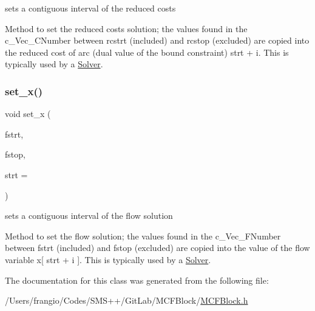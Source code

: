 sets a contiguous interval of the reduced costs 

Method to set the reduced costs solution; the values found in the c\+\_\+\+Vec\+\_\+\+C\+Number between rcstrt (included) and rcstop (excluded) are copied into the reduced cost of arc (dual value of the bound constraint) strt + i. This is typically used by a \mbox{\hyperlink{class_s_m_spp__di__unipi__it_1_1_solver}{Solver}}. \mbox{\label{class_s_m_spp__di__unipi__it_1_1_m_c_f_block_af717c8472432c989998153c0f466b69c}} 
\subsubsection{\texorpdfstring{set\+\_\+x()}{set\_x()}}
{\footnotesize\ttfamily void set\+\_\+x (\begin{DoxyParamCaption}\item[{\mbox{\hyperlink{class_s_m_spp__di__unipi__it_1_1_m_c_f_block_a2871db0555b42b11ad5315c7f631473b}{c\+\_\+\+Vec\+\_\+\+F\+Number\+\_\+it}}}]{fstrt,  }\item[{\mbox{\hyperlink{class_s_m_spp__di__unipi__it_1_1_m_c_f_block_a2871db0555b42b11ad5315c7f631473b}{c\+\_\+\+Vec\+\_\+\+F\+Number\+\_\+it}}}]{fstop,  }\item[{\mbox{\hyperlink{class_s_m_spp__di__unipi__it_1_1_m_c_f_block_aee6156e2ce80720d57a082d80f39d8cc}{c\+\_\+\+Index}}}]{strt = {} }\end{DoxyParamCaption})\hspace{0.3cm}{\ttfamily [inline]}}



sets a contiguous interval of the flow solution 

Method to set the flow solution; the values found in the c\+\_\+\+Vec\+\_\+\+F\+Number between fstrt (included) and fstop (excluded) are copied into the value of the flow variable x\mbox{[} strt + i \mbox{]}. This is typically used by a \mbox{\hyperlink{class_s_m_spp__di__unipi__it_1_1_solver}{Solver}}. 

The documentation for this class was generated from the following file\+:\begin{DoxyCompactItemize}
\item 
/\+Users/frangio/\+Codes/\+S\+M\+S++/\+Git\+Lab/\+M\+C\+F\+Block/\mbox{\hyperlink{_m_c_f_block_8h}{M\+C\+F\+Block.\+h}}\end{DoxyCompactItemize}
